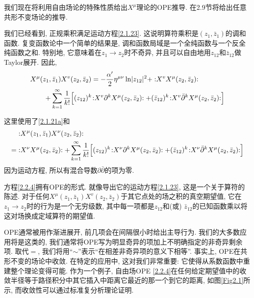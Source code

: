 我们现在将利用自由场论的特殊性质给出$X^\mu$理论的OPE推导. 在2.9节将给出任意共形不变场论的推导. 

我们已经看到, 正规乘积满足运动方程\eqref{2.1.23}. 这说明算符乘积是$(z_{1}, \bar{z}_{1})$的调和函数. 复变函数论中一个简单的结果是, 调和函数局域是一个全纯函数与一个反全纯函数之和. 特别地, 它意味着在$z_{1} \rightarrow z_{2}$时不奇异, 并且可以自由地用$z_{12}$和$\bar{z}_{12}$做Taylor展开. 因此,
\begin{align}
&X^{\mu}(z_{1}, \bar{z}_{1}) X^{v}(z_{2}, \bar{z}_{2})=-\frac{\alpha^{\prime}}{2} \eta^{\mu \nu} \ln \lvert z_{12}\rvert^{2}+ 
:\mathrel{ X^{v} X^{\mu}(z_{2}, \bar{z}_{2})}:  \nonumber \\
&\qquad +\sum_{k=1}^{\infty} \frac{1}{k!}\Bigl[(z_{12})^{k}\! :\mathrel{X^{v} \partial^{k} X^{\mu}(z_{2}, \bar{z}_{2})}:+
(\bar{z}_{12})^{k}\!:\mathrel{ X^{v} \bar{\partial}^{k} X^{\mu}(z_{2}, \bar{z}_{2})}:\Bigr] \label{2.2.4}
\end{align}
\begin{tcolorbox}
	\begin{remark}
		这里使用了\eqref{2.1.21a}和
	\begin{align*}
	&:\mathrel{X^{\mu}(z_{1},\bar{z}_{1}) X^{\nu}(z_{2}, \bar{z}_{2})}:\\
	=&: \mathrel{ X^{\nu} X^{\mu}(z_{2},\bar{z}_{2})}:+\sum_{k=1}^{\infty} \frac{1}{k !}\Bigl[(z_{12})^{k}\!:\mathrel{X^{\nu} \partial^{k} X^{\mu}(z_{2}, \bar{z}_{2})}:+(\bar{z}_{12})^{k}\!:\mathrel{X^{\nu} \bar{\partial}^{k} X^{\mu}(z_{2}, \bar{z}_{2})}:\Bigr]
	\end{align*}
	因为运动方程, 所以有混合导数$\partial \bar{\partial}$的项为零.
	\end{remark}
\end{tcolorbox}


方程\eqref{2.2.4}拥有OPE的形式. 就像导出它的运动方程\eqref{2.1.23}, 这是一个关于算符的陈述. 对于任何$X^{\mu}(z_{1},\bar{z}_{1}) X^{v}(z_{2},\bar{z}_{2})$于其它点处的场之积的真空期望值, 它在$z_{1}\to z_{2}$时的行为是一个无穷级数, 其中每一项都是$z_{12}$和(或) $\bar{z}_{12}$的已知函数乘以将这对场换成定域算符的期望值.

OPE通常被用作渐进展开, 前几项会在间隔很小时给出主导行为. 我们的大多数应用将是这类的, 我们通常将OPE写为明显奇异的项加上不明确指定的非奇异剩余项. 取代$=$, 我们将用“$\sim$”表示“在相差非奇异项的意义下相等”. 事实上, OPE在共形不变的场论中收敛. 在特定的应用中, 这对我们非常重要: 它使得从系数函数中重建整个理论变得可能. 作为一个例子, 自由场OPE \eqref{2.2.4}在任何给定期望值中的收敛半径等于路径积分中其它插入中距离它最近的那一个到它的距离, 如图\ref{Fig2.1}所示, 而收敛性可以通过标准复分析理论证明.

